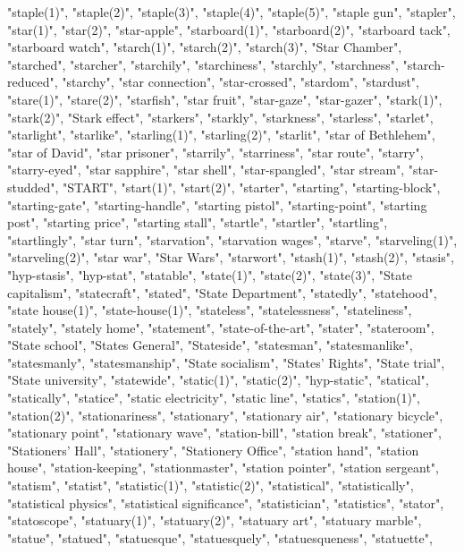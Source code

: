"staple(1)",
"staple(2)",
"staple(3)",
"staple(4)",
"staple(5)",
"staple gun",
"stapler",
"star(1)",
"star(2)",
"star-apple",
"starboard(1)",
"starboard(2)",
"starboard tack",
"starboard watch",
"starch(1)",
"starch(2)",
"starch(3)",
"Star Chamber",
"starched",
"starcher",
"starchily",
"starchiness",
"starchly",
"starchness",
"starch-reduced",
"starchy",
"star connection",
"star-crossed",
"stardom",
"stardust",
"stare(1)",
"stare(2)",
"starfish",
"star fruit",
"star-gaze",
"star-gazer",
"stark(1)",
"stark(2)",
"Stark effect",
"starkers",
"starkly",
"starkness",
"starless",
"starlet",
"starlight",
"starlike",
"starling(1)",
"starling(2)",
"starlit",
"star of Bethlehem",
"star of David",
"star prisoner",
"starrily",
"starriness",
"star route",
"starry",
"starry-eyed",
"star sapphire",
"star shell",
"star-spangled",
"star stream",
"star-studded",
"START",
"start(1)",
"start(2)",
"starter",
"starting",
"starting-block",
"starting-gate",
"starting-handle",
"starting pistol",
"starting-point",
"starting post",
"starting price",
"starting stall",
"startle",
"startler",
"startling",
"startlingly",
"star turn",
"starvation",
"starvation wages",
"starve",
"starveling(1)",
"starveling(2)",
"star war",
"Star Wars",
"starwort",
"stash(1)",
"stash(2)",
"stasis",
"hyp-stasis",
"hyp-stat",
"statable",
"state(1)",
"state(2)",
"state(3)",
"State capitalism",
"statecraft",
"stated",
"State Department",
"statedly",
"statehood",
"state house(1)",
"state-house(1)",
"stateless",
"statelessness",
"stateliness",
"stately",
"stately home",
"statement",
"state-of-the-art",
"stater",
"stateroom",
"State school",
"States General",
"Stateside",
"statesman",
"statesmanlike",
"statesmanly",
"statesmanship",
"State socialism",
"States' Rights",
"State trial",
"State university",
"statewide",
"static(1)",
"static(2)",
"hyp-static",
"statical",
"statically",
"statice",
"static electricity",
"static line",
"statics",
"station(1)",
"station(2)",
"stationariness",
"stationary",
"stationary air",
"stationary bicycle",
"stationary point",
"stationary wave",
"station-bill",
"station break",
"stationer",
"Stationers' Hall",
"stationery",
"Stationery Office",
"station hand",
"station house",
"station-keeping",
"stationmaster",
"station pointer",
"station sergeant",
"statism",
"statist",
"statistic(1)",
"statistic(2)",
"statistical",
"statistically",
"statistical physics",
"statistical significance",
"statistician",
"statistics",
"stator",
"statoscope",
"statuary(1)",
"statuary(2)",
"statuary art",
"statuary marble",
"statue",
"statued",
"statuesque",
"statuesquely",
"statuesqueness",
"statuette",
